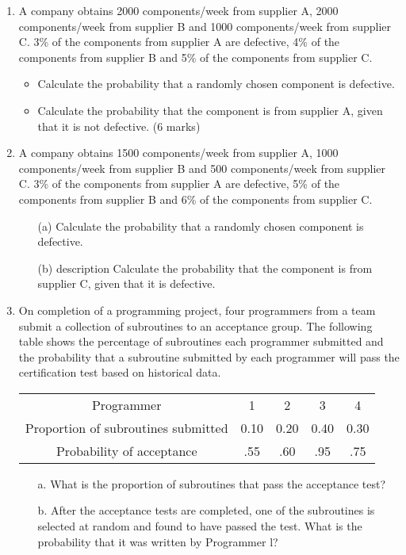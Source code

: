 \documentclass[a4paper,12pt]{article}
\begin{document}

\begin{enumerate}
\item 
	
	A company obtains 2000 components/week from supplier A, 2000 components/week from supplier B and 1000 components/week from supplier C. 3\% of the components from supplier A are defective, 4\% of the components from supplier B and 5\% of the components from supplier C.
	
	\begin{itemize}
		\item Calculate the probability that a randomly chosen component is defective.
		
		\item  Calculate the probability that the component is from supplier A, given that it is not defective.
		(6 marks)
	\end{itemize}
	
\item A company obtains 1500 components/week from supplier A, 1000 components/week from supplier B and 500 components/week from supplier C. 3\% of the components from supplier A are defective, 5\% of the components from supplier B and 6\% of the components from supplier C.

\begin{itemize}
\item[(a)]  Calculate the probability that a randomly chosen component is defective.

\item[(b)] description Calculate the probability that the component is from supplier C, given that it is defective.
\end{itemize}
\item On completion of a programming project, four programmers from a
team submit a collection of subroutines to an acceptance group. The
following table shows the percentage of subroutines each programmer
submitted and the probability that a subroutine submitted by each
programmer will pass the certification test based on historical data.
\begin{center}
\begin{tabular}{|c|c|c|c|c|}
\hline
Programmer & 1 & 2 & 3 & 4 \\
Proportion of subroutines submitted & 0.10 & 0.20 & 0.40 & 0.30 \\
Probability of acceptance & .55 & .60 & .95 & .75 \\
\hline
\end{tabular}
\end{center}
\begin{itemize}
\item[a.] What is the proportion of subroutines that pass the acceptance test?
\item[b.] After the acceptance tests are completed, one of the subroutines is
selected at random and found to have passed the test. What is the
probability that it was written by Programmer l?
\end{itemize}



\end{enumerate}
\end{document}
